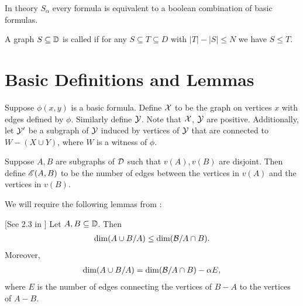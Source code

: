 \begin{Theorem} 
  In theory $S_\alpha$ every formula is equivalent to a boolean combination of basic formulas.
\end{Theorem}

\begin{Definition}
  A graph $S \subseteq \mathbb D$ is called  if for any $S \subseteq T \subseteq D$ with $|T| - |S| \leq N$ we have $S \leq T$.
\end{Definition}

\section{Basic Definitions and Lemmas}

\begin{Definition} \label{def_basic}
  Suppose $\phi(x, y)$ is a basic formula.
  Define $\mathcal X$ to be the graph on vertices $x$ with edges defined by $\phi$.
  Similarly define $\mathcal Y$.
  Note that $\mathcal X$, $\mathcal Y$ are positive.
  Additionally, let $\mathcal Y'$ be a subgraph of $\mathcal Y$ induced by vertices of $\mathcal Y$ that are connected to $W - (X \cup Y)$, where $W$ is a witness of $\phi$.
\end{Definition}

\begin{Definition} \label{def_e}
  Suppose $A, B$ are subgraphs of $\mathcal D$ such that $v(A), v(B)$ are disjoint.
  Then define $\mathscr E(A, B)$ to be the number of edges between the vertices in $v(A)$ and the vertices in $v(B)$.
\end{Definition}

We will require the following lemmas from \cite{laskowski}:

\begin{Lemma} \label{diamond} [See 2.3 in \cite{laskowski}]
  Let $A, B \subseteq \mathbb D$.
  Then
  \begin{align*}
    \dim(A \cup B / A) \leq \dim(\mathcal B / A \cap B).
  \end{align*}
  Moreover, 
  \begin{align*}
    \dim(A \cup B / A) = \dim(\mathcal B / A \cap B) - \alpha E,
  \end{align*}
  where $E$ is the number of edges connecting the vertices of $B - A$ to the vertices of $A - B$.
\end{Lemma}

